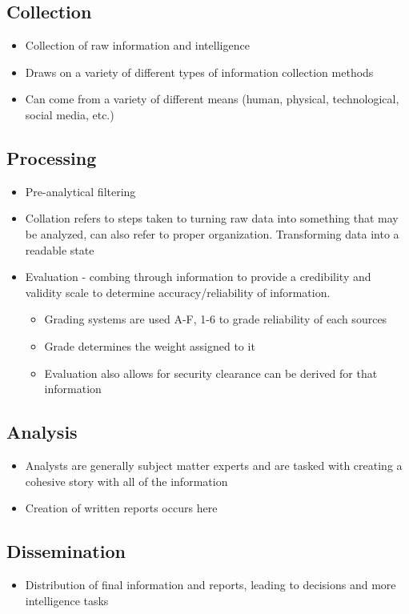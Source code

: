 \documentclass[11pt]{article}
\begin{document}
\subsection{Collection}
\label{sec:org37e0532}
\begin{itemize}
\item Collection of raw information and intelligence
\item Draws on a variety of different types of information collection methods
\item Can come from a variety of different means (human, physical, technological, social media, etc.)
\end{itemize}
\subsection{Processing}
\label{sec:orgcdbefc8}
\begin{itemize}
\item Pre-analytical filtering
\item Collation refers to steps taken to turning raw data into something that may be analyzed, can also refer to proper organization. Transforming data into a readable state
\item Evaluation - combing through information to provide a credibility and validity scale to determine accuracy/reliability of information.
\begin{itemize}
\item Grading systems are used A-F, 1-6 to grade reliability of each sources
\item Grade determines the weight assigned to it
\item Evaluation also allows for security clearance can be derived for that information
\end{itemize}
\end{itemize}
\subsection{Analysis}
\label{sec:orgb41439d}
\begin{itemize}
\item Analysts are generally subject matter experts and are tasked with creating a cohesive story with all of the information
\item Creation of written reports occurs here
\end{itemize}
\subsection{Dissemination}
\label{sec:orgaee2daa}
\begin{itemize}
\item Distribution of final information and reports, leading to decisions and more intelligence tasks
\end{itemize}
\end{document}
